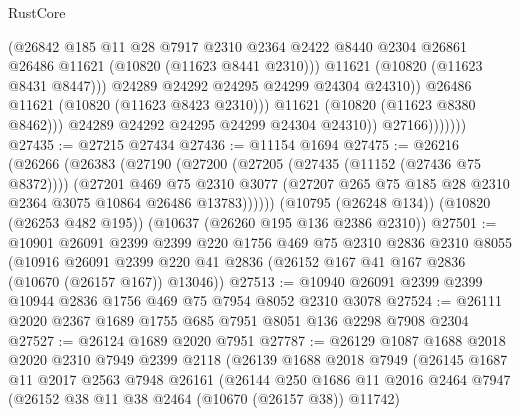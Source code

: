 \begin{lexlean}{RustCore}
\begin{coremodule}
                                (@26842
                                  @185
                                  @11
                                  @28
                                  @7917
                                  @2310
                                  @2364
                                  @2422
                                  @8440
                                  @2304
                                  @26861
                                  @26486
                                  @11621
                                  (@10820 (@11623 @8441 @2310)))
                                @11621
                                (@10820 (@11623 @8431 @8447)))
                              @24289
                              @24292
                              @24295
                              @24299
                              @24304
                              @24310))
                          @26486
                          @11621
                          (@10820 (@11623 @8423 @2310)))
                        @11621
                        (@10820 (@11623 @8380 @8462)))
                      @24289
                      @24292
                      @24295
                      @24299
                      @24304
                      @24310))
                  @27166)))))))
@27435 := @27215 @27434
@27436 := @11154 @1694
@27475 := @26216
    (@26266
      (@26383
        (@27190
          (@27200
            (@27205 (@27435 (@11152 (@27436 @75 @8372))))
            (@27201
              @469
              @75
              @2310
              @3077
              (@27207 @265 @75 @185 @28 @2310 @2364 @3075 @10864 @26486 @13783))))))
    (@10795 (@26248 @134))
    (@10820 (@26253 @482 @195))
    (@10637 (@26260 @195 @136 @2386 @2310))
@27501 := @10901
    @26091
    @2399
    @2399
    @220
    @1756
    @469
    @75
    @2310
    @2836
    @2310
    @8055
    (@10916 @26091 @2399 @220 @41 @2836 (@26152 @167 @41 @167 @2836 (@10670 (@26157 @167)) @13046))
@27513 := @10940 @26091 @2399 @2399 @10944 @2836 @1756 @469 @75 @7954 @8052 @2310 @3078
@27524 := @26111 @2020 @2367 @1689 @1755 @685 @7951 @8051 @136 @2298 @7908 @2304
@27527 := @26124 @1689 @2020 @7951
@27787 := @26129
    @1087
    @1688
    @2018
    @2020
    @2310
    @7949
    @2399
    @2118
    (@26139
      @1688
      @2018
      @7949
      (@26145
        @1687
        @11
        @2017
        @2563
        @7948
        @26161
        (@26144
          @250
          @1686
          @11
          @2016
          @2464
          @7947
          (@26152 @38 @11 @38 @2464 (@10670 (@26157 @38)) @11742)

\end{coremodule}
\end{lexlean}

